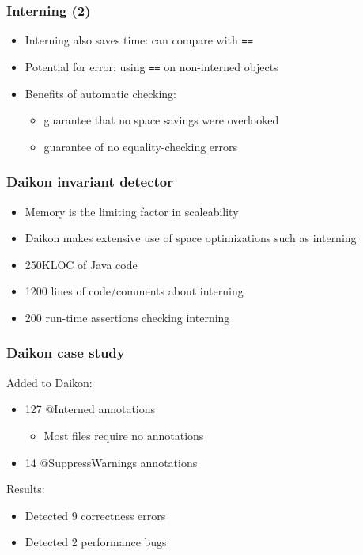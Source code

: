 \documentclass{beamer}
\begin{document}
\frame
{
  \frametitle{Interning (2)}

  \begin{itemize}
  \item Interning also saves time: can compare with \texttt{==}


  \item Potential for error: using \texttt{==} on non-interned objects


  \item Benefits of automatic checking:

  \begin{itemize}
  \item guarantee that no space savings were overlooked
  \item guarantee of no equality-checking errors
  \end{itemize}

  \end{itemize}
}

\frame
{
  \frametitle{Daikon invariant detector}
  \begin{itemize}
  \item Memory is the limiting factor in scaleability
  \item Daikon makes extensive use of space optimizations such as interning
  \item 250KLOC of Java code
  \item 1200 lines of code/comments about interning
  \item 200 run-time assertions checking interning
  \end{itemize}
}

\frame
{
  \frametitle{Daikon case study}

  Added to Daikon:
  \begin{itemize}
  \item 127 @Interned annotations
  \begin{itemize}
  \item Most files require no annotations
  \end{itemize}
  \item 14 @SuppressWarnings annotations
  \end{itemize}


  Results:
  \begin{itemize}
  \item Detected 9 correctness errors
  \item Detected 2 performance bugs
  \end{itemize}
}
\end{document}
